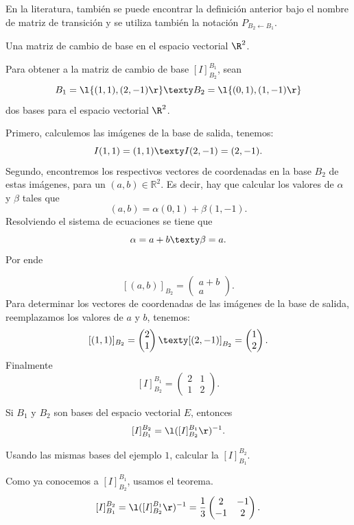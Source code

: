 \documentclass[compacto,10pt]{pubciencias-notas}
\begin{document}

\begin{advertencia}
En la literatura, también se puede encontrar la definición anterior bajo el nombre de matriz de transición y se utiliza también la notación $ P_{B_{2}\gets B_{1}}$.
\end{advertencia}

\begin{ejem}
Una matriz de cambio de base en el espacio vectorial $\R^2$.

\noindent Para obtener a la matriz de cambio de base $[I]^{B_{1}}_{B_{2}}$, sean 
\[
    B_{1} = \l\{(1,1),(2,-1)\r\}
    \texty
    B_{2} = \l\{(0,1),(1,-1)\r\}
\]
dos bases para el espacio vectorial $\R^2$.

\noindent Primero, calculemos las imágenes de la base de salida, tenemos:
\[
    I(1,1)=(1,1) \texty I(2,-1)=(2,-1).
\]
\noindent Segundo, encontremos los respectivos vectores de coordenadas en la base $B_{2}$ de estas imágenes, para un $(a,b)\in \mathbb{R}^2$. Es decir, hay que calcular los valores de $\alpha$ y $\beta$ tales que
\[
    (a,b) = \alpha (0,1) + \beta (1,-1).
\]
Resolviendo el sistema de ecuaciones se tiene que
\[
    \alpha = a + b \texty \beta = a.
\]
Por ende

\[
    [(a,b)]_{B_{2}} =
    \begin{pmatrix}
        a + b \\
        a
    \end{pmatrix}.
\]
Para determinar los vectores de coordenadas de las imágenes de la base de salida, reemplazamos los valores de $a$ y $b$, tenemos:
\[
    [(1,1)]_{B_{2}} =
    \begin{pmatrix}
        2 \\
        1
    \end{pmatrix}
    \texty
    [(2,-1)]_{B_{2}} =
    \begin{pmatrix}
        1 \\
        2
    \end{pmatrix}.
\]
Finalmente
\[
    [I]^{B_{1}}_{B_{2}} = \begin{pmatrix}2&1\\1&2\end{pmatrix}.
\]
\end{ejem}



\begin{teo}
    Si $B_{1}$ y $B_{2}$ son bases del espacio vectorial $E$, entonces
    \[
         [I]^{B_{2}}_{B_{1}} = \l([I]^{B_{1}}_{B_{2}}\r)^{-1}.
    \]
\end{teo}

\begin{ejem}
Usando las mismas bases del ejemplo $1$, calcular la $[I]^{B_{2}}_{B_{1}}$.

\noindent Como ya conocemos a $[I]^{B_{1}}_{B_{2}}$, usamos el teorema.
\[
    [I]^{B_{2}}_{B_{1}} = \l([I]^{B_{1}}_{B_{2}}\r)^{-1} = 
    \frac{1}{3}\begin{pmatrix}2&-1\\-1&2\end{pmatrix}.
\]
\end{ejem}
\end{document}
